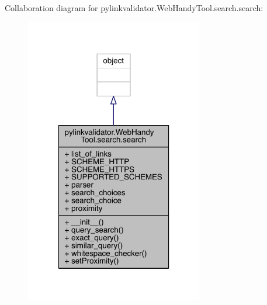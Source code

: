 Collaboration diagram for pylinkvalidator.\+Web\+Handy\+Tool.\+search.\+search\+:
\nopagebreak
\begin{figure}[H]
\begin{center}
\leavevmode
\includegraphics[width=220pt]{classpylinkvalidator_1_1_web_handy_tool_1_1search_1_1search__coll__graph}
\end{center}
\end{figure}
